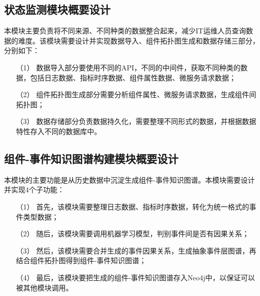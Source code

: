 \subsection{状态监测模块概要设计}
本模块主要负责将不同来源、不同种类的数据整合起来，减少IT运维人员查询数据的难度。该模块需要设计并实现数据导入、组件拓扑图生成和数据存储三部分，分别如下：
\begin{itemize}
    \item [（1）]数据导入部分要使用不同的API，不同的中间件，获取不同种类的数据，包括日志数据、指标时序数据、组件属性数据、微服务请求数据；
    \item [（2）]组件拓扑图生成部分需要分析组件属性、微服务请求数据，生成组件间拓扑图；
    \item [（3）]数据存储部分负责数据持久化，需要整理不同形式的数据，并根据数据特性存入不同的数据库中。
\end{itemize}

\subsection{组件-事件知识图谱构建模块概要设计}
本模块的主要功能是从历史数据中沉淀生成组件-事件知识图谱。本模块需要设计并实现4个子功能：
\begin{itemize}
    \item [（1）]首先，该模块需要整理日志数据、指标时序数据，转化为统一格式的事件类型数据；
    \item [（2）]随后，该模块需要调用机器学习模型，判别事件间是否有因果关系；
    \item [（3）]然后，该模块需要合并生成的事件因果关系，生成抽象事件层图谱，再结合组件拓扑图得到组件-事件知识图谱；
    \item [（4）]最后，该模块要把生成的组件-事件知识图谱存入Neo4j中，以保证可以被其他模块调用。
\end{itemize}

